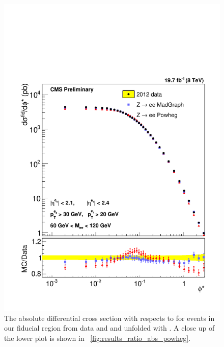 \begin{figure}[!htbp]
    \centering
    \includegraphics[width=\textwidth]{figures/ZShape_elec_PH_Abs_Dressed.pdf}
    \caption[
        The absolute differential cross section with respects to \phistar for
        \Ztoee events in our fiducial region from data and \MADGRAPH and
        \POWHEG unfolded with \POWHEG.
    ]{
        The absolute differential cross section with respects to \phistar for
        \Ztoee events in our fiducial region from data and \MADGRAPH and
        \POWHEG unfolded with \POWHEG. A close up of the lower plot is shown in
        \FIG~\ref{fig:results_ratio_abs_powheg}.
    }
    \label{fig:results_abs_powheg}
\end{figure}

